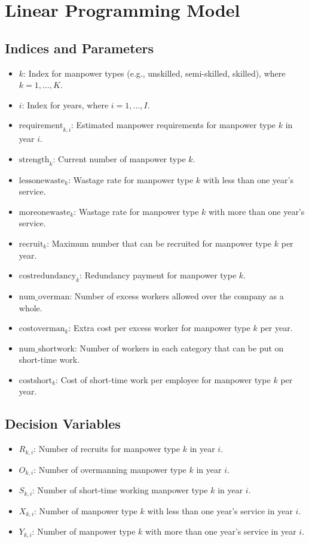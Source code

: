 \documentclass{article}
\begin{document}
\section*{Linear Programming Model}

\subsection*{Indices and Parameters}

\begin{itemize}
    \item $k$: Index for manpower types (e.g., unskilled, semi-skilled, skilled), where $k = 1, \dots, K$.
    \item $i$: Index for years, where $i = 1, \dots, I$.
    \item $\text{requirement}_{k, i}$: Estimated manpower requirements for manpower type $k$ in year $i$.
    \item $\text{strength}_{k}$: Current number of manpower type $k$.
    \item $\text{lessonewaste}_{k}$: Wastage rate for manpower type $k$ with less than one year's service.
    \item $\text{moreonewaste}_{k}$: Wastage rate for manpower type $k$ with more than one year's service.
    \item $\text{recruit}_{k}$: Maximum number that can be recruited for manpower type $k$ per year.
    \item $\text{costredundancy}_{k}$: Redundancy payment for manpower type $k$.
    \item $\text{num\_overman}$: Number of excess workers allowed over the company as a whole.
    \item $\text{costoverman}_{k}$: Extra cost per excess worker for manpower type $k$ per year.
    \item $\text{num\_shortwork}$: Number of workers in each category that can be put on short-time work.
    \item $\text{costshort}_{k}$: Cost of short-time work per employee for manpower type $k$ per year.
\end{itemize}

\subsection*{Decision Variables}

\begin{itemize}
    \item $R_{k, i}$: Number of recruits for manpower type $k$ in year $i$.
    \item $O_{k, i}$: Number of overmanning manpower type $k$ in year $i$.
    \item $S_{k, i}$: Number of short-time working manpower type $k$ in year $i$.
    \item $X_{k, i}$: Number of manpower type $k$ with less than one year's service in year $i$.
    \item $Y_{k, i}$: Number of manpower type $k$ with more than one year's service in year $i$.
\end{itemize}
\end{document}

